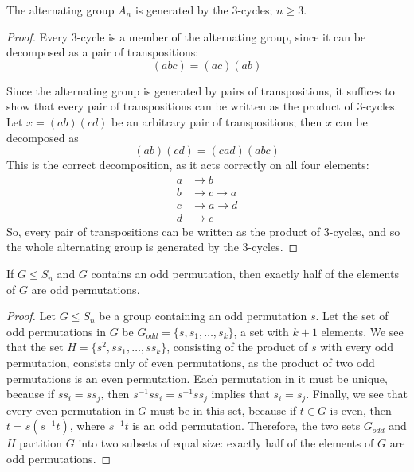 \documentclass[12pt]{article}
\theoremstyle{definition}
\newenvironment{problem}[2][Problem]{\begin{trivlist}
\item[\hskip \labelsep {\bfseries #1}\hskip \labelsep {\bfseries #2.}]}{\end{trivlist}}
\begin{document}
\begin{problem}{13}
The alternating group $A_n$ is generated by the $3$-cycles; $n \geq 3$.
\begin{proof}
    Every $3$-cycle is a member of the alternating group, since it can be decomposed as a pair of transpositions:
    \[
    (abc) = (ac)(ab)
    \]
    \par Since the alternating group is generated by pairs of transpositions, it suffices to show that every pair of transpositions can be written as the product of $3$-cycles. Let $x = (ab)(cd)$ be an arbitrary pair of transpositions; then $x$ can be decomposed as
    \[
    (ab)(cd) = (cad)(abc)
    \]
    This is the correct decomposition, as it acts correctly on all four elements:
    \begin{align*}
        a &\to b\\
        b &\to c \to a\\
        c &\to a \to d\\
        d &\to c
    \end{align*}
    So, every pair of transpositions can be written as the product of $3$-cycles, and so the whole alternating group is generated by the $3$-cycles.
\end{proof}
\end{problem}
\begin{problem}{14}
If $G \leq S_n$ and $G$ contains an odd permutation, then exactly half of the elements of $G$ are odd permutations.
\begin{proof}
Let $G \leq S_n$ be a group containing an odd permutation $s$. Let the set of odd permutations in $G$ be $G_{odd} = \{ s, s_1, \dots, s_k\}$, a set with $k+1$ elements. We see that the set $H = \{s^2, ss_1, \dots, ss_k\}$, consisting of the product of $s$ with every odd permutation, consists only of even permutations, as the product of two odd permutations is an even permutation. Each permutation in it must be unique, because if $ss_i = ss_j$, then $s^{-1}ss_i = s^{-1}ss_j$ implies that $s_i = s_j$. Finally, we see that every even permutation in $G$ must be in this set, because if $t \in G$ is even, then $t = s(s^{-1}t)$, where $s^{-1}t$ is an odd permutation. Therefore, the two sets $G_{odd}$ and $H$ partition $G$ into two subsets of equal size: exactly half of the elements of $G$ are odd permutations.
\end{proof}
\end{problem}
\end{document}
